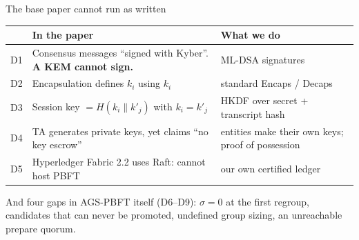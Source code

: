 \documentclass[aspectratio=169,10pt]{beamer}
\begin{document}
\begin{frame}{The base paper cannot run as written}
\small
\begin{tabular}{@{}p{0.5cm}p{6.6cm}p{6.6cm}@{}}
\toprule
& In the paper & What we do \\
\midrule
D1 & Consensus messages ``signed with Kyber''. \textbf{A KEM cannot sign.} & ML-DSA signatures \\
D2 & Encapsulation defines $k_i$ using $k_i$ & standard Encaps / Decaps \\
D3 & Session key $= H(k_i \parallel k'_j)$ with $k_i = k'_j$ & HKDF over secret + transcript hash \\
D4 & TA generates private keys, yet claims ``no key escrow'' & entities make their own keys; proof of possession \\
D5 & Hyperledger Fabric 2.2 uses Raft: cannot host PBFT & our own certified ledger \\
\bottomrule
\end{tabular}

\vspace{8pt}
And four gaps in AGS-PBFT itself (D6--D9): $\sigma = 0$ at the first regroup, candidates that can never be promoted, undefined group sizing, an unreachable prepare quorum.
\end{frame}
\end{document}
